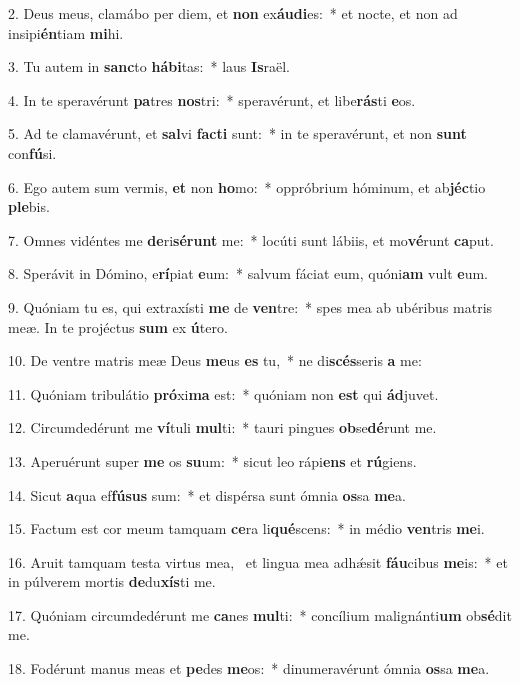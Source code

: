 2. Deus meus, clamábo per diem, et \textbf{non} ex\textbf{áu}\textbf{di}es:~*  et nocte, et non ad insipi\textbf{én}tiam \textbf{mi}hi.\

3. Tu autem in \textbf{sanc}to \textbf{há}\textbf{bi}tas:~*  laus \textbf{Is}raël.\

4. In te speravérunt \textbf{pa}tres \textbf{nos}tri:~*  speravérunt, et libe\textbf{rás}ti \textbf{e}os.\

5. Ad te clamavérunt, et \textbf{sal}vi \textbf{fac}\textbf{ti} sunt:~*  in te speravérunt, et non \textbf{sunt} con\textbf{fú}si.\

6. Ego autem sum vermis, \textbf{et} non \textbf{ho}mo:~*  oppróbrium hóminum, et ab\textbf{jéc}tio \textbf{ple}bis.\

7. Omnes vidéntes me \textbf{de}ri\textbf{sé}\textbf{runt} me:~*  locúti sunt lábiis, et mo\textbf{vé}runt \textbf{ca}put.\

8. Sperávit in Dómino, e\textbf{rí}piat \textbf{e}um:~*  salvum fáciat eum, quóni\textbf{am} vult \textbf{e}um.\

9. Quóniam tu es, qui extraxísti \textbf{me} de \textbf{ven}tre:~*  spes mea ab ubéribus matris meæ. In te projéctus \textbf{sum} ex \textbf{ú}tero.\

10. De ventre matris meæ Deus \textbf{me}us \textbf{es} tu,~*  ne di\textbf{scés}seris \textbf{a} me:\

11. Quóniam tribulátio \textbf{pró}xi\textbf{ma} est:~*  quóniam non \textbf{est} qui \textbf{ád}juvet.\

12. Circumdedérunt me \textbf{ví}tuli \textbf{mul}ti:~*  tauri pingues \textbf{ob}se\textbf{dé}runt me.\

13. Aperuérunt super \textbf{me} os \textbf{su}um:~*  sicut leo rápi\textbf{ens} et \textbf{rú}giens.\

14. Sicut \textbf{a}qua ef\textbf{fú}\textbf{sus} sum:~*  et dispérsa sunt ómnia \textbf{os}sa \textbf{me}a.\

15. Factum est cor meum tamquam \textbf{ce}ra li\textbf{qué}scens:~*  in médio \textbf{ven}tris \textbf{me}i.\

16. Aruit tamquam testa virtus mea, \dag\  et lingua mea adhǽsit \textbf{fáu}cibus \textbf{me}is:~*  et in púlverem mortis \textbf{de}du\textbf{xís}ti me.\

17. Quóniam circumdedérunt me \textbf{ca}nes \textbf{mul}ti:~*  concílium malignánti\textbf{um} ob\textbf{sé}dit me.\

18. Fodérunt manus meas et \textbf{pe}des \textbf{me}os:~*  dinumeravérunt ómnia \textbf{os}sa \textbf{me}a.\

